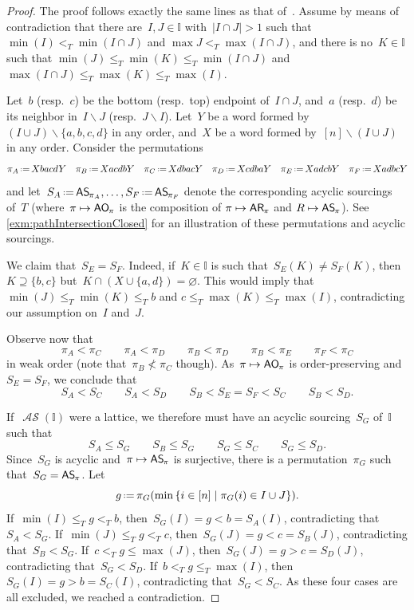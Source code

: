 \documentclass{amsart}
\theoremstyle{definition}
\newcommand{\set}[2]{\left\{ #1 \;\middle|\; #2 \right\}} %
\newcommand{\ssm}{\smallsetminus} %
\newcommand{\eqdef}{\mbox{\,\raisebox{0.2ex}{\scriptsize\ensuremath{\mathrm:}}\ensuremath{=}\,}} %
\newcommand{\mymap}[2]{\mathsf{#1}_{\hspace{-.7pt}#2}}
\newcommand{\aorn}[1]{\mymap{AO}{#1}}  %
\newcommand{\areori}[1]{\mymap{AR}{#1}}  %
\DeclareMathOperator{\ASour}{\mathcal{AS}}  %
\newcommand{\asour}[1]{\mymap{AS}{#1}}  %
\newcommand{\II}{\mathbb I} %
\begin{document}
\begin{proof}
The proof follows exactly the same lines as that of~\cite[Prop.~4.6]{BergeronPilaud}.
Assume by means of contradiction that there are~$I,J\in \II$ with~$|I\cap J|> 1$ such that $\min(I) <_T \min(I\cap J)$ and  $\max J <_T \max (I\cap J)$, and there is no~$K \in \II$ such that $\min(J) \le_T \min(K) \le_T \min(I\cap J)$ and ${\max(I\cap J) \le_T \max(K) \le_T \max(I)}$.

Let~$b$ (resp.~$c$) be the bottom (resp.~top) endpoint of~$I \cap J$, and~$a$ (resp.~$d$) be its neighbor in~$I \ssm J$ (resp.~$J \ssm I$).
Let~$Y$ be a word formed by~$(I \cup J) \ssm \{a,b,c,d\}$ in any order, and~$X$ be a word formed by~$[n] \ssm (I \cup J)$ in any order.
Consider the permutations
\[
\pi_A \eqdef XbacdY
\quad
\pi_B \eqdef XacdbY
\quad
\pi_C \eqdef XdbacY
\quad
\pi_D \eqdef XcdbaY
\quad
\pi_E \eqdef XadcbY
\quad
\pi_F \eqdef XadbcY
\]
and let~$S_A \eqdef \asour{\pi_A}, \dots, S_F \eqdef \asour{\pi_F}$ denote the corresponding acyclic sourcings of~$T$ (where~${\pi \mapsto \aorn{\pi}}$ is the composition of $\pi \mapsto \areori{\pi}$ and $R \mapsto \asour{\pi}$).
See \cref{exm:pathIntersectionClosed} for an illustration of these permutations and acyclic sourcings.

We claim that~$S_E = S_F$.
Indeed, if~$K \in \II$ is such that~$S_E(K) \ne S_F(K)$, then~$K \supseteq \{b,c\}$ but~$K \cap (X \cup \{a,d\}) = \varnothing$.
This would imply that~$\min(J) \le_T \min(K) \le_T b$ and $c \le_T \max(K) \le_T \max(I)$, contradicting our assumption on~$I$ and~$J$.

Observe now that
\[
\pi_A < \pi_C
\qquad
\pi_A < \pi_D
\qquad
\pi_B < \pi_D
\qquad
\pi_B < \pi_E
\qquad
\pi_F < \pi_C
\]
in weak order (note that~$\pi_B \not< \pi_C$ though).
As~$\pi \mapsto \aorn{\pi}$ is order-preserving and~$S_E = S_F$, we conclude that
\[
S_A < S_C
\qquad
S_A < S_D
\qquad
S_B < S_E = S_F < S_C
\qquad
S_B < S_D.
\]

If~$\ASour(\II)$ were a lattice, we therefore must have an acyclic sourcing~$S_G$ of~$\II$ such that
\[
S_A \le S_G
\qquad
S_B \le S_G
\qquad
S_G \le S_C
\qquad
S_G \le S_D.
\]
Since~$S_G$ is acyclic and~$\pi \mapsto \asour{\pi}$ is surjective, there is a permutation~$\pi_G$ such that~$S_G = \asour{\pi}$.
Let
\[
g \eqdef \pi_G(\min\set{i \in [n]}{\pi_G(i) \in I \cup J}).
\]
If~$\min(I) \le_T g <_T b$, then~$S_G(I) = g < b = S_A(I)$, contradicting that~$S_A < S_G$.
If~$\min(J) \le_T g <_T c$, then~$S_G(J) = g < c = S_B(J)$, contradicting that~$S_B < S_G$.
If~$c <_T g \le \max(J)$, then~$S_G(J) = g > c = S_D(J)$, contradicting that~$S_G < S_D$.
If~$b <_T g \le_T \max(I)$, then~$S_G(I) = g > b = S_C(I)$, contradicting that~$S_G < S_C$.
As these four cases are all excluded, we reached a contradiction.
\end{proof}
\end{document}
